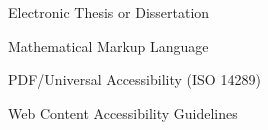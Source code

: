 
\begin{description}[leftmargin=7em]
  \item[ETD]    Electronic Thesis or Dissertation
  \item[MathML] Mathematical Markup Language
  \item[PDF/UA] PDF/Universal Accessibility (ISO 14289)
  \item[WCAG]   Web Content Accessibility Guidelines
\end{description}
